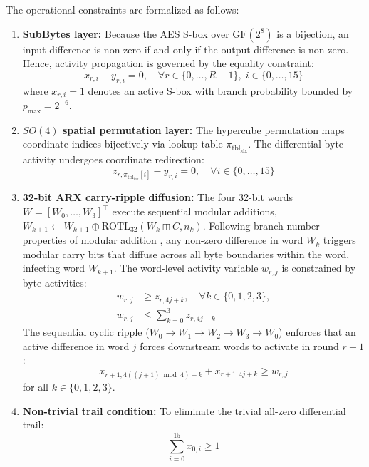 \documentclass[10pt,twocolumn]{article}
\begin{document}
The operational constraints are formalized as follows:
\begin{enumerate}
    \item \textbf{SubBytes layer:} Because the AES S-box over $\text{GF}(2^8)$ is a bijection, an input difference is non-zero if and only if the output difference is non-zero. Hence, activity propagation is governed by the equality constraint:
    \begin{equation}
        x_{r, i} - y_{r, i} = 0, \quad \forall r \in \{0, \dots, R-1\}, \; i \in \{0, \dots, 15\}
    \end{equation}
    where $x_{r, i} = 1$ denotes an active S-box with branch probability bounded by $p_{\max} = 2^{-6}$.
    
    \item \textbf{$SO(4)$ spatial permutation layer:} The hypercube permutation maps coordinate indices bijectively via lookup table $\pi_{\text{tbl}_{\text{idx}}}$. The differential byte activity undergoes coordinate redirection:
    \begin{equation}
        z_{r, \pi_{\text{tbl}_{\text{idx}}}[i]} - y_{r, i} = 0, \quad \forall i \in \{0, \dots, 15\}
    \end{equation}
    
    \item \textbf{32-bit ARX carry-ripple diffusion:} The four 32-bit words $W = [W_0, \dots, W_3]^\top$ execute sequential modular additions, $W_{k+1} \leftarrow W_{k+1} \oplus \text{ROTL}_{32}(W_k \boxplus C, n_k)$. Following branch-number properties of modular addition \cite{mouha2011differential, hadipour2023impossible}, any non-zero difference in word $W_k$ triggers modular carry bits that diffuse across all byte boundaries within the word, infecting word $W_{k+1}$. The word-level activity variable $w_{r, j}$ is constrained by byte activities:
    \begin{equation}
    \begin{aligned}
        w_{r, j} &\ge z_{r, 4j + k}, \quad \forall k \in \{0, 1, 2, 3\}, \\
        w_{r, j} &\le \sum_{k=0}^3 z_{r, 4j + k}
    \end{aligned}
    \end{equation}
    The sequential cyclic ripple ($W_0 \to W_1 \to W_2 \to W_3 \to W_0$) enforces that an active difference in word $j$ forces downstream words to activate in round $r+1$:
    \begin{equation}
        x_{r+1, 4((j+1)\bmod 4) + k} + x_{r+1, 4j + k} \ge w_{r, j}
    \end{equation}
    for all $k \in \{0, 1, 2, 3\}$.
    
    \item \textbf{Non-trivial trail condition:} To eliminate the trivial all-zero differential trail:
    \begin{equation}
        \sum_{i=0}^{15} x_{0, i} \ge 1
    \end{equation}
\end{enumerate}
\end{document}
